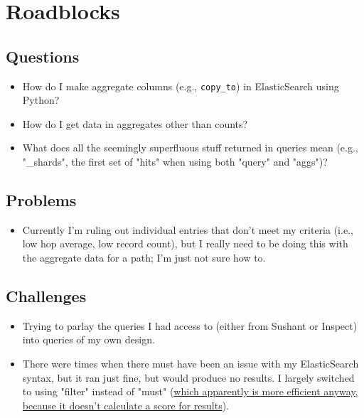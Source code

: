 \documentclass{weeklyreport}
\begin{document}
\pagebreak
\section*{Roadblocks}

\subsection*{Questions}

\begin{itemize}
	\item How do I make aggregate columns (e.g., \texttt{copy\_to}) in ElasticSearch using Python?
	\item How do I get data in aggregates other than counts?
	\item What does all the seemingly superfluous stuff returned in queries mean (e.g., "\_shards", the first set of "hits" when using both "query" and "aggs")?
\end{itemize}

\subsection*{Problems}

\begin{itemize}
	\item Currently I'm ruling out individual entries that don't meet my criteria (i.e., low hop average, low record count), but I really need to be doing this with the aggregate data for a path; I'm just not sure how to.
\end{itemize}

\subsection*{Challenges}

\begin{itemize}
    \item Trying to parlay the queries I had access to (either from Sushant or Inspect) into queries of my own design.
    \item There were times when there must have been an issue with my ElasticSearch syntax, but it ran just fine, but would produce no results. I largely switched to using "filter" instead of "must" (\href{https://stackoverflow.com/questions/43349044/what-is-the-difference-between-must-and-filter-in-query-dsl-in-elasticsearch}{which apparently is more efficient anyway, because it doesn't calculate a score for results}).
\end{itemize}
\end{document}
